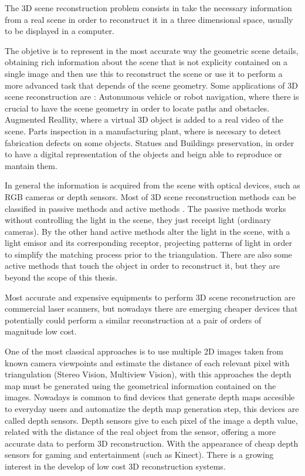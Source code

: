 
The 3D scene reconstruction problem consists in take the
necessary information from a real scene in order to reconstruct
it in a three dimensional space, usually to be displayed 
in a computer. 

The objetive is to represent in the most accurate way the geometric scene details, obtaining rich 
information about the scene that is not explicity contained on a single image and then use this 
to reconstruct the scene or use it to perform a more advanced task that depends of the scene geometry. 
Some applications of 3D scene reconstruction are : Autonumous vehicle or robot navigation, where there is crucial to have 
the scene geometry in order to locate paths and obstacles. Augmented Reallity, where a virtual 3D object
 is added to a real video of the scene. Parts inspection in a manufacturing plant, where is necesary to detect
 fabrication defects on some objects. Statues and Buildings preservation, in order to have a digital representation 
of the objects and beign able to reproduce or mantain them.

 
In general the information is acquired
 from the scene with optical devices, such as RGB cameras or depth sensors.
Most of 3D scene reconstruction methods can be classified in passive methods and active methods \cite{lanman}.
The passive methods works without controlling the light in the scene, they just receipt light (ordinary cameras). 
By the other hand active methods alter the light in the scene, with a light emisor and its corresponding 
receptor, projecting patterns of light in order to simplify the matching process prior to the triangulation. 
There are also some active methods that touch the object in order to reconstruct it, but they are beyond 
the scope of this thesis. 

Most accurate and expensive equipments to perform 3D scene reconstruction are commercial laser scanners,
 but nowadays there are emerging cheaper devices that 
potentially could perform 
a similar reconstruction at a pair of orders of magnitude low cost. 

One of the most classical approaches is to use multiple 2D
 images taken from known camera viewpoints and estimate the distance of each
 relevant pixel with triangulation (Stereo Vision, Multiview Vision), with this 
approaches the depth map must be generated using the geometrical information contained
 on the images. Nowadays is common to find devices that generate depth maps accesible
 to everyday users and automatize the depth map generation step, this devices are called depth sensors. 
Depth sensors give to each pixel of the image a depth value, related
with the distance of the real object from the sensor, offering a more
accurate data to perform 3D reconstruction. With the appearance
of cheap depth sensors for gaming and entertainment (such as
Kinect). There is a growing interest in the develop of low cost
3D reconstruction systems. 



